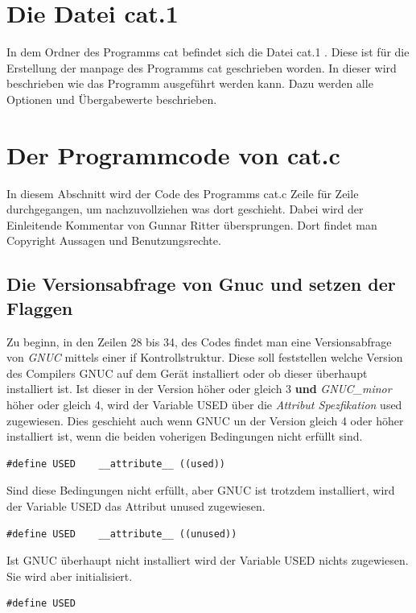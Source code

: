 {\section{Die Datei cat.1}
In dem Ordner des Programms cat befindet sich die Datei cat.1 .
Diese ist für die Erstellung der manpage des Programms cat geschrieben worden.
In dieser wird beschrieben wie das Programm ausgeführt werden kann.
Dazu werden alle Optionen und Übergabewerte beschrieben.\par


\section{Der Programmcode von cat.c}
In diesem Abschnitt wird der Code des Programms cat.c Zeile für Zeile durchgegangen, um nachzuvollziehen was dort geschieht. Dabei wird der Einleitende Kommentar von Gunnar Ritter übersprungen. Dort findet man Copyright Aussagen und Benutzungsrechte.

\subsection{Die Versionsabfrage von Gnuc und setzen der Flaggen}
Zu beginn, in den Zeilen 28 bis 34, des Codes findet man eine Versionsabfrage von \textit{GNUC} mittels einer if Kontrollstruktur. Diese soll feststellen welche Version des Compilers GNUC auf dem Gerät installiert oder ob dieser überhaupt installiert ist. Ist dieser in der Version höher oder gleich 3 \textbf{und} \textit{GNUC\_minor} höher oder gleich 4, wird der Variable USED über die \textit{Attribut Spezfikation} used zugewiesen. Dies geschieht auch wenn GNUC un der Version gleich 4 oder höher installiert ist, wenn die beiden voherigen Bedingungen nicht erfüllt sind.

\begin{lstlisting}
#define USED	__attribute__ ((used))
\end{lstlisting}

Sind diese Bedingungen nicht erfüllt, aber GNUC ist trotzdem installiert, wird der Variable USED das Attribut unused zugewiesen.

\begin{lstlisting}
#define USED	__attribute__ ((unused))
\end{lstlisting}

Ist GNUC überhaupt nicht installiert wird der Variable USED nichts zugewiesen. Sie wird aber initialisiert.

\begin{lstlisting}
#define USED
\end{lstlisting}

}
